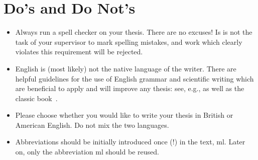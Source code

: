 \chapter{Do's and Do Not's}

\begin{itemize}
    \item Always run a spell checker on your thesis. There are no excuses! Is is not the
      task of your supervisor to mark spelling mistakes, and work which clearly violates
      this requirement will be rejected.
    \item English is (most likely) not the native language of the writer. There are
      helpful guidelines for the use of English grammar and scientific writing which are
      beneficial to apply and will improve any thesis: see, e.g., \cite{IEEEstyleguide,
      Gol06} as well as the classic book~\cite{Stu12}.
    \item Please choose whether you would like to write your thesis in British or American
      English. Do not mix the two languages.    
    \item Abbreviations should be initially introduced once (!) in the text, \eg
      \acrfull{ml}. Later on, only the abbreviation \acrshort{ml} should be reused.
\end{itemize}
